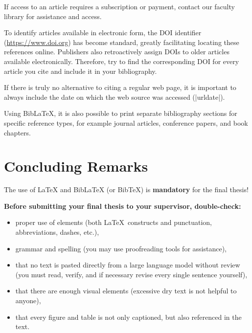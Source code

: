 \documentclass[9pt]{style/friteza}
\begin{document}
If access to an article requires a subscription or payment, contact our faculty library for assistance and access.

To identify articles available in electronic form, the DOI identifier
(\url{https://www.doi.org}) has become standard, greatly facilitating locating these references online.
Publishers also retroactively assign DOIs to older articles available electronically.
Therefore, try to find the corresponding DOI for every article you cite and include it in your bibliography.

If there is truly no alternative to citing a regular web page, it is important to always include the date on which the web source was accessed (\ltx|urldate|).

Using Bib\LaTeX{}, it is also possible to print separate bibliography sections for specific reference types, for example journal articles, conference papers, and book chapters.
 

\section{Concluding Remarks}

The use of \LaTeX{} and Bib\LaTeX{} (or Bib\TeX) is \textbf{mandatory} for the final thesis!


\textbf{Before submitting your final thesis to your supervisor, double-check:}
\begin{itemize}
    \item proper use of elements (both \LaTeX\ constructs and punctuation, abbreviations, dashes, etc.),
    \item grammar and spelling (you may use proofreading tools for assistance),
    \item that no text is pasted directly from a large language model without review (you must read, verify, and if necessary revise every single sentence yourself),
    \item that there are enough visual elements (excessive dry text is not helpful to anyone),
    \item that every figure and table is not only captioned, but also referenced in the text.
\end{itemize}
\end{document}
